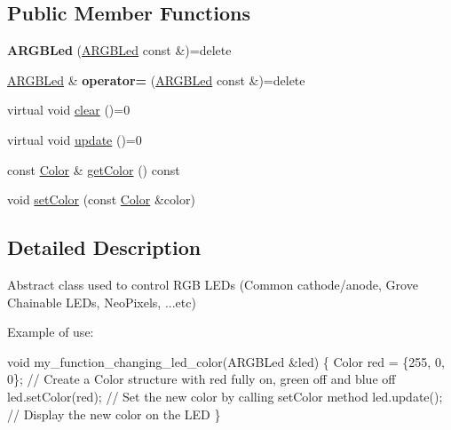 \subsection*{Public Member Functions}
\begin{DoxyCompactItemize}
\item 
\mbox{\label{classwood_box_1_1display_1_1_a_r_g_b_led_a9d09c3d236e0ff522f1c4057aee6e3a9}} 
{\bfseries A\+R\+G\+B\+Led} (\mbox{\hyperlink{classwood_box_1_1display_1_1_a_r_g_b_led}{A\+R\+G\+B\+Led}} const \&)=delete
\item 
\mbox{\label{classwood_box_1_1display_1_1_a_r_g_b_led_acbc8bea5a3b1fe292d3ac37ab647d21b}} 
\mbox{\hyperlink{classwood_box_1_1display_1_1_a_r_g_b_led}{A\+R\+G\+B\+Led}} \& {\bfseries operator=} (\mbox{\hyperlink{classwood_box_1_1display_1_1_a_r_g_b_led}{A\+R\+G\+B\+Led}} const \&)=delete
\item 
virtual void \mbox{\hyperlink{classwood_box_1_1display_1_1_a_r_g_b_led_a01eeaee1bbb439e81f5f9bc536c04df7}{clear}} ()=0
\item 
virtual void \mbox{\hyperlink{classwood_box_1_1display_1_1_a_r_g_b_led_ab71f321d91e931f95b96d1f492a9454d}{update}} ()=0
\item 
const \mbox{\hyperlink{structwood_box_1_1display_1_1_a_r_g_b_led_1_1_color}{Color}} \& \mbox{\hyperlink{classwood_box_1_1display_1_1_a_r_g_b_led_ae0bd01eab303006612eb46058824b0c1}{get\+Color}} () const
\item 
void \mbox{\hyperlink{classwood_box_1_1display_1_1_a_r_g_b_led_ac06b3ee90d2f49785173e9142df47bb7}{set\+Color}} (const \mbox{\hyperlink{structwood_box_1_1display_1_1_a_r_g_b_led_1_1_color}{Color}} \&color)
\end{DoxyCompactItemize}


\subsection{Detailed Description}
Abstract class used to control R\+GB L\+E\+Ds (Common cathode/anode, Grove Chainable L\+E\+Ds, Neo\+Pixels, ...etc)

Example of use\+:


\begin{DoxyCode}
\textcolor{keywordtype}{void} my\_function\_changing\_led\_color(ARGBLed &led) \{
  Color red = \{255, 0, 0\}; \textcolor{comment}{// Create a Color structure with red fully on, green off and blue off}
  led.setColor(red); \textcolor{comment}{// Set the new color by calling setColor method}
  led.update(); \textcolor{comment}{// Display the new color on the LED}
\}
\end{DoxyCode}
 

